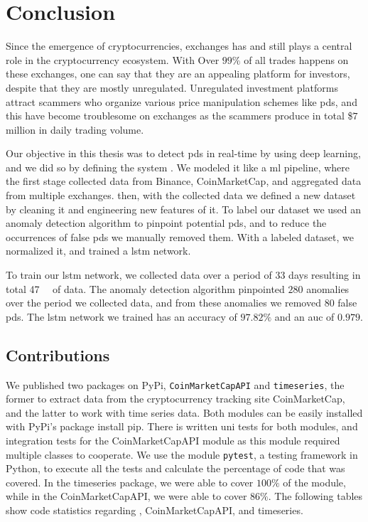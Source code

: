 
\chapter{Conclusion}\label{ch:conclusion}\glsresetall
Since the emergence of cryptocurrencies, exchanges has and still plays a central role in the cryptocurrency ecosystem. With Over $99\%$ of all trades happens on these exchanges, one can say that they are an appealing platform for investors, despite that they are mostly unregulated. Unregulated investment platforms attract scammers who organize various price manipulation schemes like \acp{pd}, and this have become troublesome on exchanges as the scammers produce in total \$$7$ million in daily trading volume.

Our objective in this thesis was to detect \acp{pd} in real-time by using deep learning, and we did so by defining the system \project. We modeled it like a \ac{ml} pipeline, where the first stage collected data from Binance, CoinMarketCap, and aggregated data from multiple exchanges. then, with the collected data we defined a new dataset by cleaning it and engineering new features of it. To label our dataset we used an anomaly detection algorithm to pinpoint potential \acp{pd}, and to reduce the occurrences of false \acp{pd} we manually removed them. With a labeled dataset, we normalized it, and trained a \ac{lstm} network.

To train our \ac{lstm} network, we collected data over a period of $33$ days resulting in total \SI{47}{\giga\byte} of data. The anomaly detection algorithm pinpointed $280$ anomalies over the period we collected data, and from these anomalies we removed $80$ false \acp{pd}. The \ac{lstm} network we trained has an accuracy of $97.82\%$ and an \ac{auc} of $0.979$.

\section{Contributions}
We published two packages on PyPi,  \texttt{CoinMarketCapAPI} and \texttt{timeseries}, the former to extract data from the cryptocurrency tracking site CoinMarketCap, and the latter to work with time series data. Both modules can be easily installed with PyPi's package install pip. There is written uni tests for both modules, and integration tests for the CoinMarketCapAPI module as this module required multiple classes to cooperate. We use the module \texttt{pytest}, a testing framework in Python, to execute all the tests and calculate the percentage of code that was covered. In the timeseries package, we were able to cover $100\%$ of the module, while in the CoinMarketCapAPI, we were able to cover $86\%$. The following tables show code statistics regarding \project, CoinMarketCapAPI, and timeseries.

